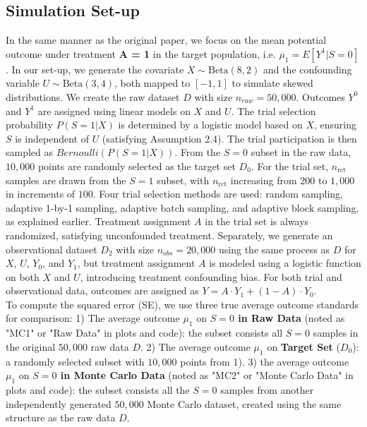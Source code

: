 \documentclass[12pt, oneside]{amsart}
\theoremstyle{definition}
\theoremstyle{remark}
\numberwithin{equation}{section}
\begin{document}
\subsection{Simulation Set-up}
In the same manner as the original paper, we focus on the mean potential outcome under treatment \textbf{A = 1} in the target population, i.e. ${\mu_1} = E[Y^1 |S= 0]$. In our set-up, we generate the covariate $X \sim \text{Beta}(8,2)$ and the confounding variable $U \sim \text{Beta}(3,4)$, both mapped to $[-1, 1]$ to simulate skewed distributions. We create the raw dataset $D$ with size $n_{raw}=50,000$.  Outcomes $Y^0$ and $Y^1$ are assigned using linear models on $X$ and $U$. The trial selection probability $P(S=1|X)$ is determined by a logistic model based on $X$, ensuring $S$ is independent of $U$ (satisfying Assumption 2.4). The trial participation is then sampled as $Bernoulli(P(S=1|X))$. From the $S=0$ subset in the raw data, $10,000$ points are randomly selected as the target set $D_0$. For the trial set, $n_{\text{rct}}$ samples are drawn from the $S=1$ subset, with $n_{\text{rct}}$ increasing from $200$ to $1,000$ in increments of $100$. Four trial selection methods are used: random sampling, adaptive 1-by-1 sampling, adaptive batch sampling, and adaptive block sampling, as explained earlier. Treatment assignment $A$ in the trial set is always randomized, satisfying unconfounded treatment. Separately, we generate an observational dataset $D_2$ with size $n_{obs} =20,000$ using the same process as $D$ for $X$, $U$, $Y_0$, and $Y_1$, but treatment assignment $A$ is modeled using a logistic function on both $X$ and $U$, introducing treatment confounding bias. For both trial and observational data, outcomes are assigned as $Y = A \cdot Y_1 + (1 - A) \cdot Y_0$.\\

 To compute the squared error (SE), we use three true average outcome standards for comparison: 1) The average outcome $\mu_1$ on \textbf{$S=0$ in Raw Data} (noted as "MC1" or "Raw Data" in plots and code): the subset consists all $S=0$ samples in the original $50,000$ raw data $D$. 2) The average outcome $\mu_1$ on \textbf{Target Set} ($D_0$): a randomly selected subset with $10,000$ points from 1). 3) the average outcome $\mu_1$ on \textbf{$S=0$ in Monte Carlo Data} (noted as "MC2" or "Monte Carlo Data" in plots and code): the subset consists all the $S=0$ samples from another independently generated $50,000$ Monte Carlo dataset, created using the same structure as the raw data $D$.\\
\end{document}
